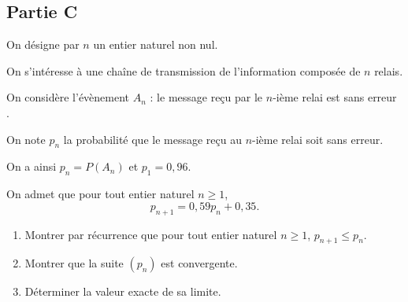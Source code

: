 	\subsection*{Partie C}
		On désigne par $n$ un entier naturel non nul.

		On s'intéresse à une chaîne de transmission de l'information composée de $n$ relais.

		On considère l'évènement $A_{n}$ : \og le message reçu par le $n$-ième relai est sans erreur \fg{}.

		On note $p_{n}$ la probabilité que le message reçu au $n$-ième relai soit sans erreur.

		On a ainsi $p_{n}=P\left(A_{n}\right)$ et $p_{1}=0,96$.

		On admet que pour tout entier naturel $n \geqslant 1$,
		\[p_{n+1}=0,59 p_{n}+0,35.\]

		\begin{enumerate}
			\item Montrer par récurrence que pour tout entier naturel $n \geqslant 1$, \quad $p_{n+1} \leqslant p_{n}$.

			\item Montrer que la suite $(p_{n})$ est convergente.

			\item Déterminer la valeur exacte de sa limite.
		\end{enumerate}
